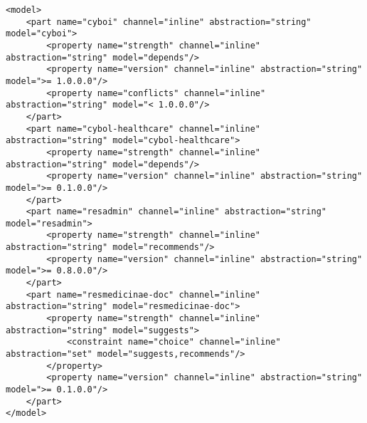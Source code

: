 \begin{scriptsize}
    \begin{verbatim}
<model>
    <part name="cyboi" channel="inline" abstraction="string" model="cyboi">
        <property name="strength" channel="inline" abstraction="string" model="depends"/>
        <property name="version" channel="inline" abstraction="string" model=">= 1.0.0.0"/>
        <property name="conflicts" channel="inline" abstraction="string" model="< 1.0.0.0"/>
    </part>
    <part name="cybol-healthcare" channel="inline" abstraction="string" model="cybol-healthcare">
        <property name="strength" channel="inline" abstraction="string" model="depends"/>
        <property name="version" channel="inline" abstraction="string" model=">= 0.1.0.0"/>
    </part>
    <part name="resadmin" channel="inline" abstraction="string" model="resadmin">
        <property name="strength" channel="inline" abstraction="string" model="recommends"/>
        <property name="version" channel="inline" abstraction="string" model=">= 0.8.0.0"/>
    </part>
    <part name="resmedicinae-doc" channel="inline" abstraction="string" model="resmedicinae-doc">
        <property name="strength" channel="inline" abstraction="string" model="suggests">
            <constraint name="choice" channel="inline" abstraction="set" model="suggests,recommends"/>
        </property>
        <property name="version" channel="inline" abstraction="string" model=">= 0.1.0.0"/>
    </part>
</model>
    \end{verbatim}
\end{scriptsize}
